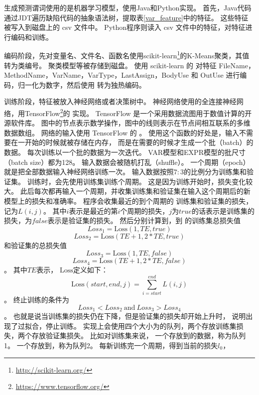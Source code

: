 生成预测谓词使用的是机器学习模型，使用Java和Python实现。
首先，Java代码通过JDT遍历缺陷代码的抽象语法树，提取表\ref{var_feature}中的特征。
这些特征被写入到磁盘上的 csv 文件中。
Python程序则读入 csv 文件中的特征，对特征进行编码和训练。

编码阶段，先对变量名、文件名、函数名使用scikit-learn\footnote{\url{http://scikit-learn.org/}}的K-Means聚类，其值转为类编号。
聚类模型等被存储到磁盘。
使用 scikit-learn 的  对特征 FileName，MethodName，VarName，VarType，LastAssign，BodyUse
和 OutUse 进行编码，归一化为数字，然后使用  转为独热编码。

训练阶段，特征被放入神经网络或者决策树中。
神经网络使用的全连接神经网络，用TensorFlow\footnote{\url{https://www.tensorflow.org/}}的  实现。
TensorFlow 是一个采用数据流图用于数值计算的开源软件库。
图中的节点表示数学操作，图中的线则表示在节点间相互联系的多维数据数组。
网络的输入使用 TensorFlow 的 。
使用这个函数的好处是，输入不需要在一开始的时候就被存储在内存，
而是在需要的时候才生成一个批（batch）的数据。
每次训练以一个批的数据为一次迭代。
VAR模型和EXPR模型的批尺寸（batch size）都为128。
输入数据会被随机打乱（shuffle）。
一个周期（epoch）就是把全部数据输入神经网络训练一次。
输入数据按照$7:3$的比例分为训练集和验证集。
训练时，会先使用训练集训练个周期。
这是因为训练开始时，损失变化较大。
此后每次都再输入一个周期，并收集训练集和验证集在输入这个周期后的新模型上的损失和准确率。
程序会收集最近的到个周期的
训练集和验证集的损失，记为$L(i, j)$。
其中$i$表示是最近的第$i$个周期的损失，$j$为$true$的话表示是训练集的损失，为$false$表示是验证集的损失。
然后分别计算到，到
的训练集总损失值
$$
Loss_1 = \mathrm{Loss}(1, TE, true)
$$
$$
Loss_2 = \mathrm{Loss}(TE + 1, 2 * TE, true)
$$
和验证集的总损失值
$$
Loss_3 = \mathrm{Loss}(1, TE, false)
$$
$$
Loss_4 = \mathrm{Loss}(TE + 1, 2 * TE, false)
$$。
其中$TE$表示，
$\mathrm{Loss}$定义如下：
$$
\mathrm{Loss}(start, end, j) = \sum_{i=start}^{end}{L(i, j)}
$$。
终止训练的条件为
$$
Loss_1 < Loss_2 \ \mathrm{and} \ Loss_3 > Loss_4
$$。
也就是说当训练集的损失仍在下降，但是验证集的损失却开始上升时，
说明出现了过拟合，停止训练。
实现上会使用四个大小为的队列，两个存放训练集损失，两个存放验证集损失。
比如对训练集来说，
一个存放到的数据，称为队列1。
一个存放到，称为队列2。
每新训练完一个周期，得到当前的损失$l_0$，
